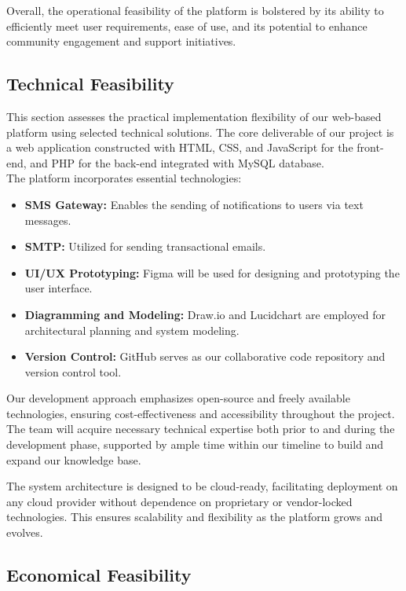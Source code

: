 Overall, the operational feasibility of the platform is bolstered by its ability to efficiently meet user requirements, ease of use, and its potential to enhance community engagement and support initiatives.


\subsection{Technical Feasibility}

This section assesses the practical implementation flexibility of our web-based platform using selected technical solutions. The core deliverable of our project is a web application constructed with HTML, CSS, and JavaScript for the front-end, and PHP for the back-end integrated with MySQL database. \\

The platform incorporates essential technologies:
\begin{itemize}
\itemsep0em 
    \item \textbf{SMS Gateway:} Enables the sending of notifications to users via text messages.
    \item \textbf{SMTP:} Utilized for sending transactional emails.
    \item \textbf{UI/UX Prototyping:} Figma will be used for designing and prototyping the user interface.
    \item \textbf{Diagramming and Modeling:} Draw.io and Lucidchart are employed for architectural planning and system modeling.
    \item \textbf{Version Control:} GitHub serves as our collaborative code repository and version control tool.
\end{itemize}

Our development approach emphasizes open-source and freely available technologies, ensuring cost-effectiveness and accessibility throughout the project. The team will acquire necessary technical expertise both prior to and during the development phase, supported by ample time within our timeline to build and expand our knowledge base.

The system architecture is designed to be cloud-ready, facilitating deployment on any cloud provider without dependence on proprietary or vendor-locked technologies. This ensures scalability and flexibility as the platform grows and evolves.\\

\subsection{Economical Feasibility}

